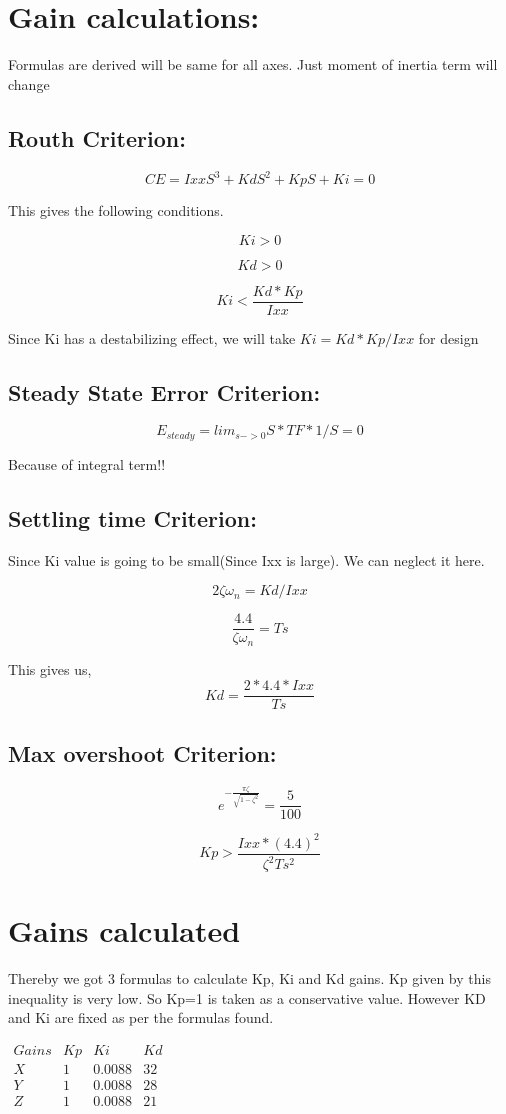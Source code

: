 \documentclass[10pt,a4paper]{report}
\begin{document}
\section{Gain calculations:}

Formulas are derived will be same for all axes. Just moment of inertia
term will change

\subsection{Routh Criterion:}

\[
CE=IxxS^{3}+KdS^{2}+KpS+Ki=0
\]

This gives the following conditions.

\[
Ki>0
\]

\[
Kd>0
\]

\[
Ki<\frac{Kd*Kp}{Ixx}
\]

Since Ki has a destabilizing effect, we will take $Ki=Kd*Kp/Ixx$
for design

\subsection{Steady State Error Criterion:}

\[
E_{steady}=lim_{s->0}S*TF*1/S=0
\]

Because of integral term!!

\subsection{Settling time Criterion:}

Since Ki value is going to be small(Since Ixx is large). We can neglect
it here.

\[
2\zeta\omega_{n}=Kd/Ixx
\]

\[
\frac{4.4}{\zeta\omega_{n}}=Ts
\]

This gives us,\textbf{
	\[
	Kd=\frac{2*4.4*Ixx}{Ts}
	\]
}

\subsection{Max overshoot Criterion:}


\[
e^{-\frac{\pi\zeta}{\sqrt{1-\zeta^{2}}}}=\frac{5}{100}
\]

\[
Kp>\frac{Ixx*(4.4)^{2}}{\zeta^{2}Ts^{2}}
\]
\section{Gains calculated}
Thereby we got 3 formulas to calculate Kp, Ki and Kd gains. Kp given
by this inequality is very low. So Kp=1 is taken as a conservative
value. However KD and Ki are fixed as per the formulas found.
\begin{center}
	$\begin{array}{cccc}
	Gains & Kp & Ki & Kd\\
	X & 1 & 0.0088 & 32\\
	Y & 1 & 0.0088 & 28\\
	Z & 1 & 0.0088 & 21
	\end{array}$
	\par\end{center}
\end{document}
